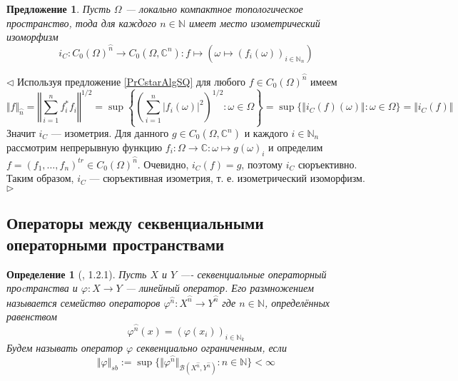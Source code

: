 \documentclass[12pt]{article}
\newtheorem{proposition}[theorem]{Предложение}
\newtheorem{definition}[theorem]{Определение}
\newenvironment{proof}{\par $\triangleleft$}{$\triangleright$}
\begin{document}
\begin{proposition}\label{PrCommCstarSQ} Пусть $\Omega$ --- локально компактное топологическое пространство, тода для каждого $n\in\mathbb{N}$ имеет место изометрический изоморфизм
$$
i_C:C_0(\Omega)^{\wideparen{n}}\to C_0(\Omega,\mathbb{C}^n):f\mapsto (\omega\mapsto(f_i(\omega))_{i\in\mathbb{N}_n})
$$
\end{proposition} 
\begin{proof} Используя предложение \ref{PrCstarAlgSQ} для любого $f\in C_0(\Omega)^{\wideparen{n}}$ имеем
$$
\Vert f\Vert_{\wideparen{n}}
=\left\Vert \sum\limits_{i=1}^n f_i^* f_i\right\Vert^{1/2}
=\sup\left\{\left(\sum\limits_{i=1}^n |f_i(\omega)|^2\right)^{1/2}:\omega\in\Omega\right\}
=\sup\{\Vert i_C(f)(\omega)\Vert:\omega\in\Omega\}
=\Vert i_C(f)\Vert
$$
Значит $i_C$ --- изометрия. Для данного $g\in C_0(\Omega,\mathbb{C}^n)$ и каждого $i\in\mathbb{N}_n$ рассмотрим непрерывную функцию $f_i:\Omega\to\mathbb{C}:\omega\mapsto g(\omega)_i$ и определим $f=(f_1,\ldots,f_n)^{tr}\in C_0(\Omega)^{\wideparen{n}}$. Очевидно, $i_C(f)=g$, поэтому $i_C$ сюръективно. Таким образом, $i_C$ --- сюръективная изометрия, т. е. изометрический изоморфизм.
\end{proof}


































\subsection{Операторы между секвенциальными операторными пространствами}

\begin{definition}[\cite{LamOpFolgen}, 1.2.1]\label{DefSBOp}
Пусть $X$ и $Y$ ---- секвенциальные операторный проcтранства и $\varphi : X \to Y$ --- линейный оператор. Его \textit{размножением} называется семейство операторов $\varphi^{\wideparen{n}} : X^{\wideparen{n}} \to Y^{\wideparen{n}}$ 
где $n\in\mathbb{N}$, определённых равенством 
$$
\varphi^{\wideparen{n}}(x)=(\varphi(x_i))_{i\in\mathbb{N}_k}
$$
Будем называть оператор $\varphi$ \textit{секвенциально ограниченным}, если 
$$
\Vert \varphi \Vert_{sb} := \sup\{\Vert \varphi^{\wideparen{n}}\Vert_{\mathcal{B}(X^{\wideparen{n}},Y^{\wideparen{n}})}:n\in\mathbb{N}\}  < \infty
$$
\end{definition}
\end{document}
